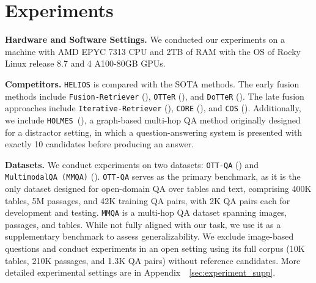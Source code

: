 \vspace{-1.5mm}
\section{Experiments}
\label{sec:experiments}
\vspace{-1.5mm}





\textbf{Hardware and Software Settings.}
We conducted our experiments on a machine with AMD EPYC 7313 CPU and 2TB of RAM with the OS of Rocky Linux release 8.7 and 4 A100-80GB GPUs.

\textbf{Competitors.}
\texttt{HELIOS} is compared with the SOTA methods. 
The early fusion methods include \texttt{Fusion-Retriever} (\citealp{OTT-QA}), \texttt{OTTeR} (\citealp{OTTeR}), and \texttt{DoTTeR} (\citealp{DoTTeR}). 
The late fusion approaches include \texttt{Iterative-Retriever} (\citealp{OTT-QA}), \texttt{CORE} (\citealp{CORE}), and \texttt{COS} (\citealp{COS}).
{
\feditcolor
Additionally, we include \texttt{HOLMES}~(\citealp{HOLMES}), a graph-based multi-hop QA method originally designed for a distractor setting, in which a question-answering system is presented with exactly 10 candidates before producing an answer.
}

\textbf{Datasets.}
We conduct experiments on two datasets: \texttt{OTT-QA} (\citealp{OTT-QA}) and \texttt{MultimodalQA (MMQA)} (\citealp{MultiModalQA}). 
\texttt{OTT-QA} serves as the primary benchmark, as it is the only dataset designed for open-domain QA over tables and text, comprising 400K tables, 5M passages, and 42K training QA pairs, with 2K QA pairs each for development and testing.
\texttt{MMQA} is a multi-hop QA dataset spanning images, passages, and tables. 
While not fully aligned with our task, we use it as a supplementary benchmark to assess generalizability. 
We exclude image-based questions and conduct experiments in an open setting using its full corpus (10K tables, 210K passages, and 1.3K QA pairs) without reference candidates. More detailed experimental settings are in Appendix~\textsection~\ref{sec:experiment_supp}.



























